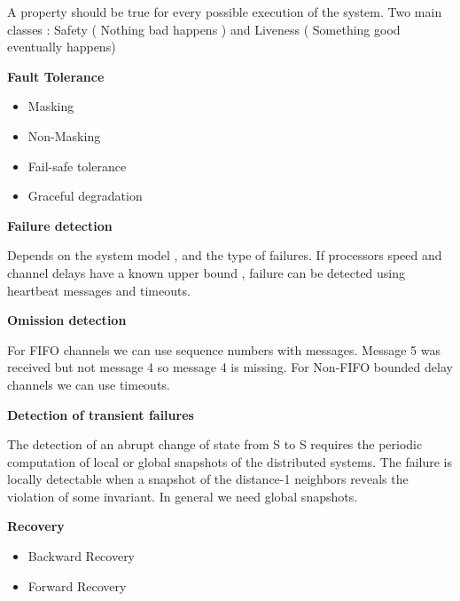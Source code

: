 \documentclass{article}
\begin{document}
A property should be true for every possible execution of the system. Two main classes : Safety ( Nothing bad happens ) and Liveness ( Something good eventually happens)

\vspace{3mm}
\textbf{Fault Tolerance}

\begin{itemize}
    \item Masking 
    \item Non-Masking 
    \item Fail-safe tolerance 
    \item Graceful degradation 
\end{itemize}

\vspace{3mm}
\textbf{Failure detection}

Depends on the system model , and the type of failures. If processors speed and channel delays have a known upper bound , failure can be detected using heartbeat messages and timeouts. 

\vspace{3mm}
\textbf{Omission detection}

For FIFO channels we can use sequence numbers with messages. Message 5 was received but not message 4 so message 4 is missing.
For Non-FIFO bounded delay channels we can use timeouts.

\vspace{3mm}
\textbf{Detection of transient failures}

The detection of an abrupt change of state from S to S requires the periodic computation of local or global snapshots of the distributed systems. The failure is locally detectable when a snapshot of the distance-1 neighbors reveals the violation of some invariant. In general we need global snapshots.

\vspace{3mm}
\textbf{Recovery}

\begin{itemize}
    \item Backward Recovery 
    \item Forward Recovery 
\end{itemize}
\end{document}
